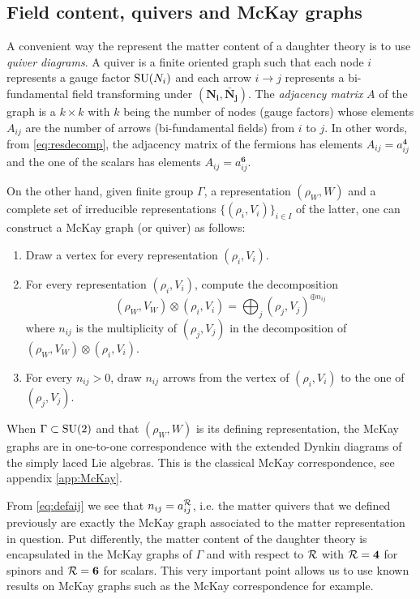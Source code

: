     \subsection{Field content, quivers and McKay graphs}

        A convenient way the represent the matter content of a daughter theory is to use \emph{quiver diagrams}. A quiver is a finite oriented graph such that each node $i$ represents a gauge factor $\text{SU}(N_i)$ and each arrow $i\to j$ represents a bi-fundamental field transforming under $(\boldsymbol{\textbf{N}_i},\boldsymbol{\bar{\textbf{N}}_j})$. The \emph{adjacency matrix} $A$ of the graph is a $k\times k$ with $k$ being the number of nodes (gauge factors) whose elements $A_{ij}$ are the number of arrows (bi-fundamental fields) from $i$ to $j$. In other words, from \eqref{eq:resdecomp}, the adjacency matrix of the fermions has elements $A_{ij}=a^{\boldsymbol{4}}_{ij}$ and the one of the scalars has elements $A_{ij}=a^{\boldsymbol{6}}_{ij}$.

        On the other hand, given finite group $\Gamma$, a representation $(\rho_W,W)$ and a complete set of irreducible representations $\{(\rho_i,V_i)\}_{i\in I}$ of the latter, one can construct a McKay graph (or quiver) as follows:
        \begin{enumerate}
            \item Draw a vertex for every representation $(\rho_i,V_i)$.
            \item For every representation $(\rho_i,V_i)$, compute the decomposition
            \begin{equation*}
                (\rho_W,V_W)\otimes(\rho_i,V_i)=\bigoplus_j (\rho_j,V_j)^{\oplus n_{ij}}
            \end{equation*}
            where $n_{ij}$ is the multiplicity of $(\rho_j,V_j)$ in the decomposition of $(\rho_W,V_W)\otimes(\rho_i,V_i)$.
            \item For every $n_{ij}>0$, draw $n_{ij}$ arrows from the vertex of $(\rho_i,V_i)$ to the one of $(\rho_j,V_j)$.
        \end{enumerate}
        When $\Gamma\subset\text{SU}(2)$ and that $(\rho_W,W)$ is its defining representation, the McKay graphs are in one-to-one correspondence with the extended Dynkin diagrams of the simply laced Lie algebras. This is the classical McKay correspondence, see appendix \ref{app:McKay}.
        
        From \eqref{eq:defaij} we see that $n_{ij}=a^{\mathcal{R}}_{ij}$, i.e. the matter quivers that we defined previously are exactly the McKay graph associated to the matter representation in question. Put differently, the matter content of the daughter theory is encapsulated in the McKay graphs of $\Gamma$ and with respect to $\mathcal{R}$ with $\mathcal{R}=\boldsymbol{4}$ for spinors and $\mathcal{R}=\boldsymbol{6}$ for scalars. This very important point allows us to use known results on McKay graphs such as the McKay correspondence for example.


